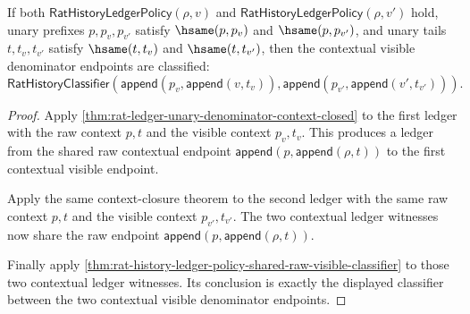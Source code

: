 \begin{theorem}
\label{thm:rat-history-ledger-shared-raw-context-visible-classifier}
If both $\mathsf{RatHistoryLedgerPolicy}(\rho,v)$ and
$\mathsf{RatHistoryLedgerPolicy}(\rho,v')$ hold, unary prefixes $p,p_v,p_{v'}$
satisfy $\hsame(p,p_v)$ and $\hsame(p,p_{v'})$, and unary tails
$t,t_v,t_{v'}$ satisfy $\hsame(t,t_v)$ and $\hsame(t,t_{v'})$, then the
contextual visible denominator endpoints are classified:
$$
\mathsf{RatHistoryClassifier}(\mathsf{append}(p_v,\mathsf{append}(v,t_v)),
\mathsf{append}(p_{v'},\mathsf{append}(v',t_{v'}))).
$$
\end{theorem}
\begin{proof}
Apply \autoref{thm:rat-ledger-unary-denominator-context-closed} to the first
ledger with the raw context $p,t$ and the visible context $p_v,t_v$. This
produces a ledger from the shared raw contextual endpoint
$\mathsf{append}(p,\mathsf{append}(\rho,t))$ to the first contextual visible
endpoint.

Apply the same context-closure theorem to the second ledger with the same raw
context $p,t$ and the visible context $p_{v'},t_{v'}$. The two contextual
ledger witnesses now share the raw endpoint
$\mathsf{append}(p,\mathsf{append}(\rho,t))$.

Finally apply
\autoref{thm:rat-history-ledger-policy-shared-raw-visible-classifier} to those
two contextual ledger witnesses. Its conclusion is exactly the displayed
classifier between the two contextual visible denominator endpoints.
\end{proof}

